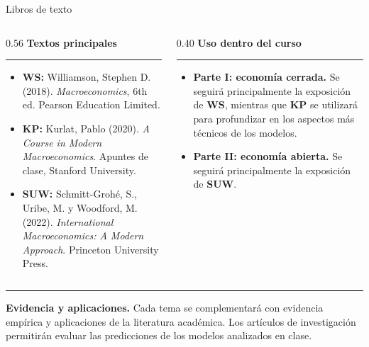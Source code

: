 \documentclass[aspectratio=169,11pt]{beamer}
\begin{document}
\begin{frame}[t]{Libros de texto}

\footnotesize

\begin{columns}[T,onlytextwidth]
  \begin{column}{0.56\textwidth}
    \textbf{Textos principales}

    \vspace{0.08cm}
    \hrule
    \vspace{0.12cm}

    \begin{itemize}
      \setlength{\itemsep}{0.35em}

      \item \textbf{WS:} Williamson, Stephen D. (2018).
      \textit{Macroeconomics}, 6th ed. Pearson Education Limited.

      \item \textbf{KP:} Kurlat, Pablo (2020).
      \textit{A Course in Modern Macroeconomics}.
      Apuntes de clase, Stanford University.

      \item \textbf{SUW:} Schmitt-Grohé, S., Uribe, M. y Woodford, M. (2022).
      \textit{International Macroeconomics: A Modern Approach}.
      Princeton University Press.
    \end{itemize}
  \end{column}

  \begin{column}{0.40\textwidth}
    \textbf{Uso dentro del curso}

    \vspace{0.08cm}
    \hrule
    \vspace{0.12cm}

    \begin{itemize}
      \setlength{\itemsep}{0.45em}

      \item \textbf{Parte I: economía cerrada.}
      Se seguirá principalmente la exposición de \textbf{WS}, mientras que \textbf{KP} se utilizará para profundizar en los aspectos más técnicos de los modelos.

      \item \textbf{Parte II: economía abierta.}
      Se seguirá principalmente la exposición de \textbf{SUW}.
    \end{itemize}
  \end{column}

\end{columns}

\vspace{0.18cm}
\hrule
\vspace{0.12cm}

\textbf{Evidencia y aplicaciones.}
Cada tema se complementará con evidencia empírica y aplicaciones de la literatura académica. Los artículos de investigación permitirán evaluar las predicciones de los modelos analizados en clase.

\end{frame}
\end{document}
